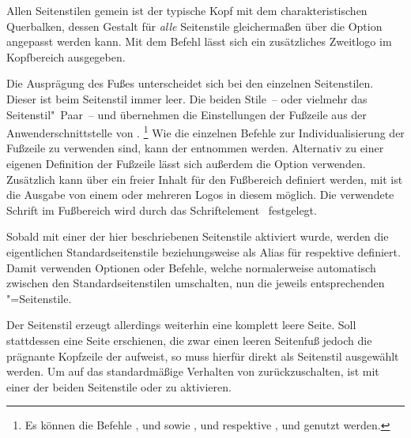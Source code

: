 \begin{DeclareEntity*}{}
\begin{DeclareEntity*}{}
\begin{DeclareEntity*}{}
\begin{Declaration}
\begin{Declaration}
\begin{Declaration}
%
Allen Seitenstilen gemein ist der typische Kopf mit dem charakteristischen 
Querbalken, dessen Gestalt für \emph{alle} Seitenstile gleichermaßen über die 
Option  angepasst werden kann. Mit dem Befehl  
lässt sich ein zusätzliches Zweitlogo im Kopfbereich ausgegeben.

Die Ausprägung des Fußes unterscheidet sich bei den einzelnen Seitenstilen. 
Dieser ist beim Seitenstil  immer leer. Die beiden 
Stile~-- oder vielmehr das Seitenstil"~Paar~--  und 
 übernehmen die Einstellungen der Fußzeile aus der 
Anwenderschnittstelle von .%
\footnote{%
  Es können die Befehle
  ,  und  sowie , 
   und  respektive ,  und 
   genutzt werden.%
}
Wie die einzelnen Befehle zur Individualisierung der Fußzeile zu verwenden 
sind, kann der  entnommen werden. Alternativ 
zu einer eigenen Definition der Fußzeile lässt sich außerdem die Option 
 verwenden. Zusätzlich kann über  ein freier 
Inhalt für den Fußbereich definiert werden, mit  ist die 
Ausgabe von einem oder mehreren Logos in diesem möglich. Die verwendete Schrift 
im Fußbereich wird durch das Schriftelement~ festgelegt.

Sobald mit  einer der hier beschriebenen 
Seitenstile aktiviert wurde, werden die eigentlichen Standardseitenstile 
 beziehungsweise  als Alias für 
 respektive  definiert. 
Damit verwenden Optionen oder Befehle, welche normalerweise automatisch 
zwischen den Standardseitenstilen umschalten, nun die jeweils entsprechenden 
"=Seitenstile.

Der Seitenstil  erzeugt allerdings weiterhin eine komplett 
leere Seite. Soll stattdessen eine Seite erschienen, die zwar einen leeren 
Seitenfuß jedoch die prägnante Kopfzeile der \TnUD aufweist, so muss hierfür 
direkt  als Seitenstil ausgewählt werden. Um auf 
das standardmäßige Verhalten von \KOMAScript zurückzuschalten, ist mit 
 einer der beiden Seitenstile 
 oder  zu aktivieren.%
%
\end{Declaration}
\end{Declaration}
\end{Declaration}


\end{DeclareEntity*}
\end{DeclareEntity*}
\end{DeclareEntity*}
